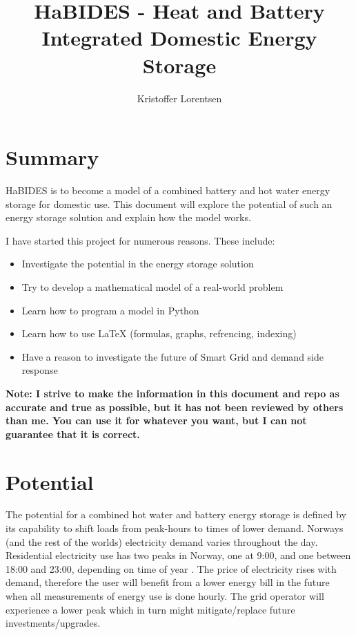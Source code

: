 \documentclass[11pt]{article} %
\title{HaBIDES - Heat and Battery Integrated Domestic Energy Storage}
\author{Kristoffer Lorentsen}
\begin{document}
\maketitle

\tableofcontents

\section{Summary}

HaBIDES is to become a model of a combined battery and hot water energy storage for domestic use. This document will explore the potential of such an energy storage solution and explain how the model works.

I have started this project for numerous reasons. These include:

\begin{itemize}
	\item Investigate the potential in the energy storage solution
	\item Try to develop a mathematical model of a real-world problem
	\item Learn how to program a model in Python
	\item Learn how to use LaTeX (formulas, graphs, refrencing, indexing)
	\item Have a reason to investigate the future of Smart Grid and demand side response
\end{itemize}

\textbf{Note: I strive to make the information in this document and repo as accurate and true as possible, but it has not been reviewed by others than me. You can use it for whatever you want, but I can not guarantee that it is correct.}

\section{Potential}

The potential for a combined hot water and battery energy storage is defined by its capability to shift loads from peak-hours to times of lower demand. Norways (and the rest of the worlds) electricity demand varies throughout the day. Residential electricity use has two peaks in Norway, one at 9:00, and one between 18:00 and 23:00, depending on time of year \cite{TEricson2008}. The price of electricity rises with demand, therefore the user will benefit from a lower energy bill in the future when all measurements of energy use is done hourly\cite{AMSforskriften}. The grid operator will experience a lower peak which in turn might mitigate/replace future investments/upgrades.
\end{document}
